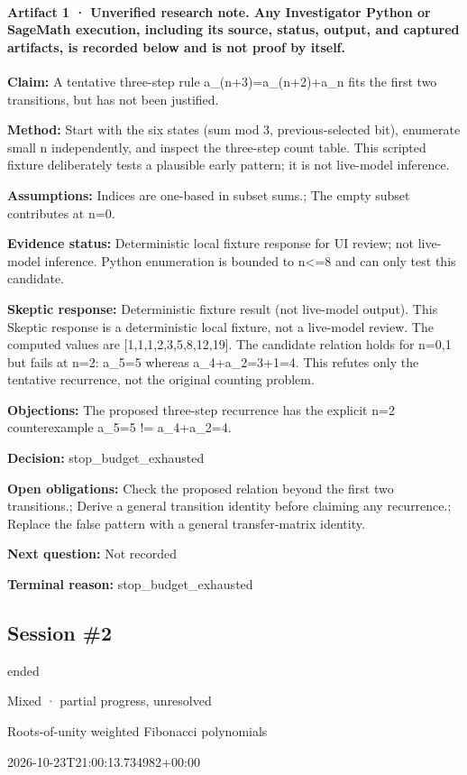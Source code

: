 \documentclass[11pt]{article}
\begin{document}
\paragraph{Artifact 1 · Unverified research note. Any Investigator Python or SageMath execution, including its source, status, output, and captured artifacts, is recorded below and is not proof by itself.}
\textbf{Claim:} A tentative three-step rule a\_(n+3)=a\_(n+2)+a\_n fits the first two transitions, but has not been justified.\par
\textbf{Method:} Start with the six states (sum mod 3, previous-selected bit), enumerate small n independently, and inspect the three-step count table. This scripted fixture deliberately tests a plausible early pattern; it is not live-model inference.\par
\textbf{Assumptions:} Indices are one-based in subset sums.; The empty subset contributes at n=0.\par
\textbf{Evidence status:} Deterministic local fixture response for UI review; not live-model inference. Python enumeration is bounded to n\textless{}=8 and can only test this candidate.\par
\textbf{Skeptic response:} Deterministic fixture result (not live-model output). This Skeptic response is a deterministic local fixture, not a live-model review. The computed values are [1,1,1,2,3,5,8,12,19]. The candidate relation holds for n=0,1 but fails at n=2: a\_5=5 whereas a\_4+a\_2=3+1=4. This refutes only the tentative recurrence, not the original counting problem.\par
\textbf{Objections:} The proposed three-step recurrence has the explicit n=2 counterexample a\_5=5 != a\_4+a\_2=4.\par
\textbf{Decision:} stop\_budget\_exhausted\par
\textbf{Open obligations:} Check the proposed relation beyond the first two transitions.; Derive a general transition identity before claiming any recurrence.; Replace the false pattern with a general transfer-matrix identity.\par
\textbf{Next question:} Not recorded\par
\textbf{Terminal reason:} stop\_budget\_exhausted\par
\subsection{Session \#2}
\begin{description}[style=nextline,font=\normalfont\bfseries,leftmargin=0pt,labelsep=0pt]
\item[Execution status] ended
\item[Outcome] Mixed · partial progress, unresolved
\item[Strategy] Roots-of-unity weighted Fibonacci polynomials
\item[Started] 2026-10-23T21:00:13.734982+00:00
\end{description}
\end{document}
